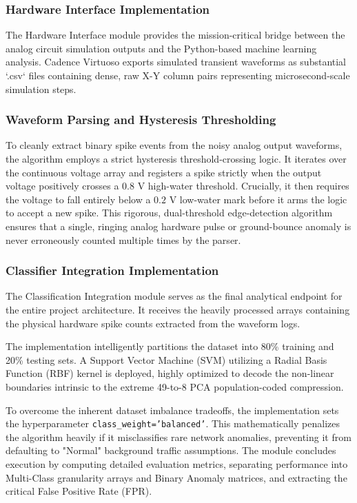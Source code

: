 \documentclass{ieeeaccess}
\begin{document}
\subsubsection{Hardware Interface Implementation}

The Hardware Interface module provides the mission-critical bridge between the analog circuit simulation outputs and the Python-based machine learning analysis. Cadence Virtuoso exports simulated transient waveforms as substantial `.csv` files containing dense, raw X-Y column pairs representing microsecond-scale simulation steps.

\subsubsection{Waveform Parsing and Hysteresis Thresholding}
To cleanly extract binary spike events from the noisy analog output waveforms, the algorithm employs a strict hysteresis threshold-crossing logic. It iterates over the continuous voltage array and registers a spike strictly when the output voltage positively crosses a $0.8\text{ V}$ high-water threshold. Crucially, it then requires the voltage to fall entirely below a $0.2\text{ V}$ low-water mark before it arms the logic to accept a new spike. This rigorous, dual-threshold edge-detection algorithm ensures that a single, ringing analog hardware pulse or ground-bounce anomaly is never erroneously counted multiple times by the parser.

\subsubsection{Classifier Integration Implementation}

The Classification Integration module serves as the final analytical endpoint for the entire project architecture. It receives the heavily processed arrays containing the physical hardware spike counts extracted from the waveform logs.

The implementation intelligently partitions the dataset into 80\% training and 20\% testing sets. A Support Vector Machine (SVM) utilizing a Radial Basis Function (RBF) kernel is deployed, highly optimized to decode the non-linear boundaries intrinsic to the extreme 49-to-8 PCA population-coded compression. 

To overcome the inherent dataset imbalance tradeoffs, the implementation sets the hyperparameter \texttt{class\_weight='balanced'}. This mathematically penalizes the algorithm heavily if it misclassifies rare network anomalies, preventing it from defaulting to "Normal" background traffic assumptions. The module concludes execution by computing detailed evaluation metrics, separating performance into Multi-Class granularity arrays and Binary Anomaly matrices, and extracting the critical False Positive Rate (FPR).
\end{document}
